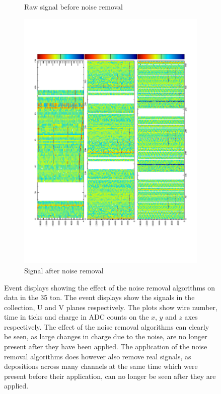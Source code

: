 \begin{figure}[h!]
\begin{subfigure}{0.55\textwidth}
    \caption{Raw signal before noise removal}
  \end{subfigure}
  \begin{subfigure}{0.55\textwidth}
    \centering
    \includegraphics[width=\textwidth]{Evd_AfterNoise}
    \caption{Signal after noise removal}
  \end{subfigure}
  \caption[The effect of noise removal algorithms in the 35 ton]
          {Event displays showing the effect of the noise removal algorithms on data in the 35 ton. The event displays show the signals in the collection, U and V planes respectively. The plots show wire number, time in ticks and charge in ADC counts on the $x$, $y$ and $z$ axes respectively. The effect of the noise removal algorithms can clearly be seen, as large changes in charge due to the noise, are no longer present after they have been applied. The application of the noise removal algorithms does however also remove real signals, as depositions across many channels at the same time which were present before their application, can no longer be seen after they are applied.}
  \label{fig:NoiseRemoval}
\end{figure}


